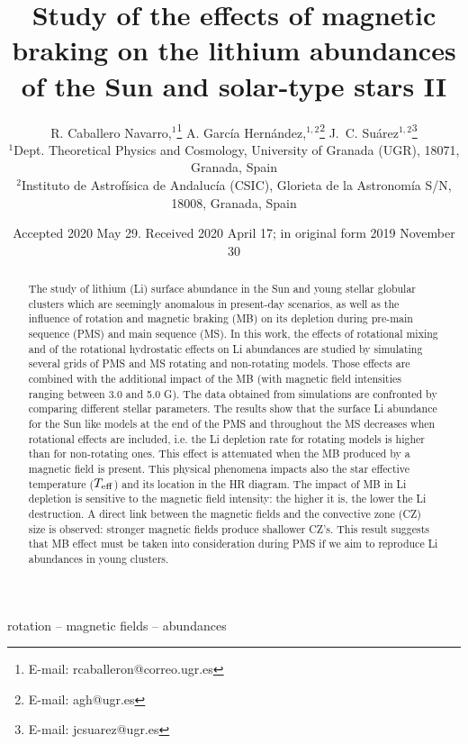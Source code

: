 \documentclass[fleqn,usenatbib]{mnras}
\title[Rotation, magnetic braking \& Li abundances II]{Study of the effects of magnetic braking on the lithium abundances of the Sun and solar-type stars II}
\author[R. Caballero Navarro et al.]{
R. Caballero Navarro,$^{1}$\thanks{E-mail: rcaballeron@correo.ugr.es}
A. Garc\'ia Hern\'andez,$^{1,2}$\thanks{E-mail: agh@ugr.es}
J.~C. Su\'arez$^{1,2}$\thanks{E-mail: jcsuarez@ugr.es}
\\
$^{1}$Dept. Theoretical Physics and Cosmology, University of Granada (UGR), 18071, Granada, Spain\\
$^{2}$Instituto de Astrof\'isica de Andaluc\'ia (CSIC), Glorieta de la Astronom\'ia S/N, 18008, Granada, Spain\\
}
\date{Accepted 2020 May 29. Received 2020 April 17; in original form 2019 November 30}
\begin{document}
\label{firstpage}
\pagerange{\pageref{firstpage}--\pageref{lastpage}}
\maketitle

\begin{abstract}
The study of lithium (Li) surface abundance in the Sun and young stellar globular clusters which are seemingly anomalous in present-day scenarios, as well as the influence of rotation and magnetic braking (MB) on its depletion during pre-main sequence (PMS) and main sequence (MS).
In this work, the effects of rotational mixing and of the rotational hydrostatic effects on Li abundances are studied by simulating several grids of PMS and MS rotating and non-rotating models. Those effects are combined with the additional impact of the MB (with magnetic field intensities ranging between 3.0 and 5.0 G). The data obtained from simulations are confronted by comparing different stellar parameters. The results show that the surface Li abundance for the Sun like models at the end of the PMS and throughout the MS decreases when rotational effects are included, i.e. the Li depletion rate for rotating models is higher than for non-rotating ones. This effect is attenuated when the MB produced by a magnetic field is present. This physical phenomena impacts also the star effective temperature ($T_{\mathrm{eff}}$) and its location in the HR diagram. The impact of MB in Li depletion is sensitive to the magnetic field intensity: the higher it is, the lower the Li destruction. A direct link between the magnetic fields and the convective zone (CZ) size is observed: stronger magnetic fields produce shallower CZ's. This result suggests that MB effect must be taken into consideration during PMS if we aim to reproduce Li abundances in young clusters.
\end{abstract}

\begin{keywords}
rotation -- magnetic fields -- abundances
\end{keywords}


\end{document}
